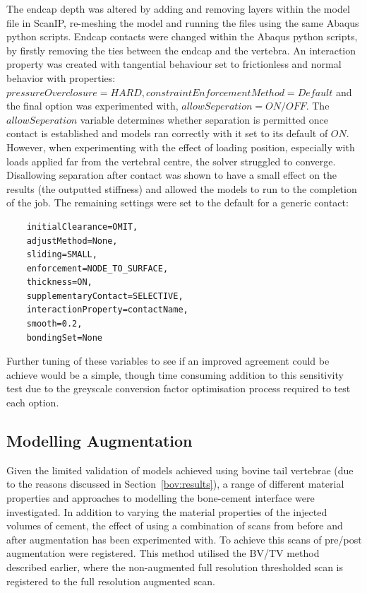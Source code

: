 The endcap depth was altered by adding and removing layers within the model file in ScanIP, re-meshing the model and running the files using the same Abaqus python scripts.
Endcap contacts were changed within the Abaqus python scripts, by firstly removing the ties between the endcap and the vertebra.
An interaction property was created with tangential behaviour set to frictionless and normal behavior with properties: $pressureOverclosure=HARD,  constraintEnforcementMethod=Default$ and the final option was experimented with, $allowSeperation=ON/OFF$.
The $allowSeperation$ variable determines whether separation is permitted once contact is established and models ran correctly with it set to its default of $ON$.
However, when experimenting with the effect of loading position, especially with loads applied far from the vertebral centre, the solver struggled to converge.
Disallowing separation after contact was shown to have a small effect on the results (the outputted stiffness) and allowed the models to run to the completion of the job.
The remaining settings were set to the default for a generic contact: 
\begin{verbatim}
	initialClearance=OMIT, 
	adjustMethod=None, 
	sliding=SMALL, 
	enforcement=NODE_TO_SURFACE, 
	thickness=ON, 
	supplementaryContact=SELECTIVE, 
	interactionProperty=contactName, 
	smooth=0.2, 
	bondingSet=None
\end{verbatim}

Further tuning of these variables to see if an improved agreement could be achieve would be a simple, though time consuming addition to this sensitivity test due to the greyscale conversion factor optimisation process required to test each option.

\subsection{Modelling Augmentation}

Given the limited validation of models achieved using bovine tail vertebrae (due to the reasons discussed in Section~\ref{bov:results}), a range of different material properties and approaches to modelling the bone-cement interface were investigated.
In addition to varying the material properties of the injected volumes of cement, the effect of using a combination of scans from before and after augmentation has been experimented with.
To achieve this scans of pre/post augmentation were registered.
This method utilised the BV/TV method described earlier, where the non-augmented full resolution thresholded scan is registered to the full resolution augmented scan.

